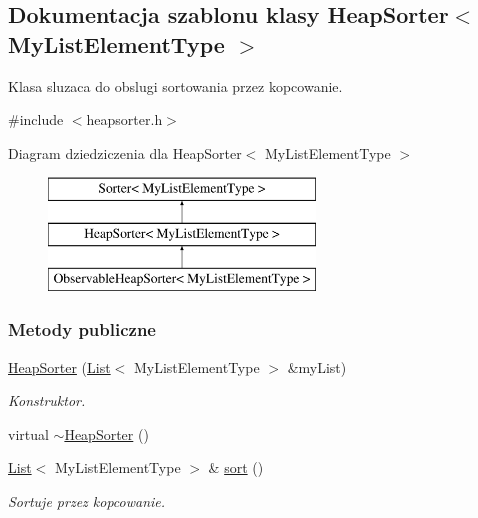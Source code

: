 \hypertarget{class_heap_sorter}{\subsection{Dokumentacja szablonu klasy Heap\-Sorter$<$ My\-List\-Element\-Type $>$}
\label{class_heap_sorter}
}


Klasa sluzaca do obslugi sortowania przez kopcowanie.  




{\ttfamily \#include $<$heapsorter.\-h$>$}

Diagram dziedziczenia dla Heap\-Sorter$<$ My\-List\-Element\-Type $>$\begin{figure}[H]
\begin{center}
\leavevmode
\includegraphics[height=3.000000cm]{class_heap_sorter}
\end{center}
\end{figure}
\subsubsection*{Metody publiczne}
\begin{DoxyCompactItemize}
\item 
\hyperlink{class_heap_sorter_a7d5fba788aae93bcfc1a300615dba080}{Heap\-Sorter} (\hyperlink{class_list}{List}$<$ My\-List\-Element\-Type $>$ \&my\-List)
\begin{DoxyCompactList}\small\item\em Konstruktor. \end{DoxyCompactList}\item 
virtual \hyperlink{class_heap_sorter_ab661e8598cf879b9c8f721c644633e66}{$\sim$\-Heap\-Sorter} ()
\item 
\hyperlink{class_list}{List}$<$ My\-List\-Element\-Type $>$ \& \hyperlink{class_heap_sorter_a31220ba55d4478c50578c3a94dcbf26c}{sort} ()
\begin{DoxyCompactList}\small\item\em Sortuje przez kopcowanie. \end{DoxyCompactList}\end{DoxyCompactItemize}
